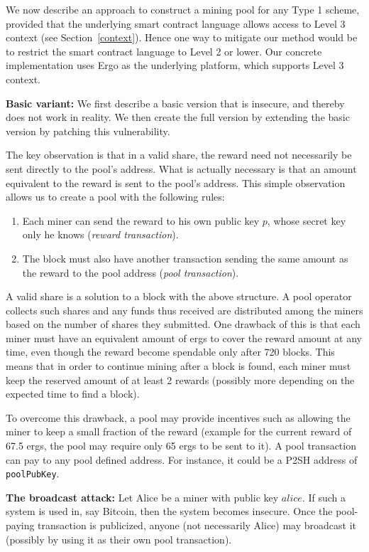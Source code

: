 \documentclass[11pt]{article}
\newcommand{\authnote}[2]{\marginpar{\parbox{\marginparwidth}{\tiny %
  \textsf{#1 {\textcolor{blue}{notes: #2}}}}}%
  \textcolor{blue}{\textbf{\dag}}}
\newcommand{\authnote}[2]{
  \textsf{#1 \textcolor{blue}{: #2}}}
\newcommand{\authnote}[2]{}
\newcommand{\snote}[1]{{\authnote{\textcolor{red}{Scalahub notes}}{#1}}}
\begin{document}
We now describe an approach to construct a mining pool for any Type 1 scheme, provided that the underlying smart contract language allows access to Level 3 context (see Section~\ref{context}). Hence one way to mitigate our method would be to restrict the smart contract language to Level 2 or lower. Our concrete implementation uses Ergo as the underlying platform, which supports Level 3 context.

\textbf{Basic variant:} We first describe a basic version that is insecure, and thereby does not work in reality. We then create the full version by extending the basic version by patching this vulnerability.

The key observation is that in a valid share, the reward need not necessarily be sent directly to the pool's address. What is actually necessary is that an amount equivalent to the reward is sent to the pool's address. This simple observation allows us to create a pool with the following rules:
\begin{enumerate}
	\item Each miner can send the reward to his own public key $p$, whose secret key only he knows ({\em reward transaction}).
	\item The block must also have another transaction sending the same amount as the reward to the pool address ({\em pool transaction}).
\end{enumerate}

\snote{Maybe make this section less Ergo-specific}

A valid share is a solution to a block with the above structure. A pool operator collects such shares and any funds thus received are distributed among the miners based on the number of shares they submitted. One drawback of this is that each miner must have an equivalent amount of ergs to cover the reward amount at any time, even though the reward become spendable only after 720 blocks. 
This means that in order to continue mining after a block is found, each miner must keep the reserved amount of at least 2 rewards (possibly more depending on the expected time to find a block).

 To overcome this drawback, a pool may provide incentives such as allowing the miner to keep a small fraction of the reward (example for the current reward of 67.5 ergs, the pool may require only 65 ergs to be sent to it). A pool transaction can pay to any pool defined address. For instance, it could be a P2SH address of \texttt{poolPubKey}. 


\textbf{The broadcast attack:} Let Alice be a miner with public key $alice$. If such a system is used in, say Bitcoin, then the system becomes insecure. Once the pool-paying transaction is publicized, anyone (not necessarily Alice) may broadcast it (possibly by using it as their own pool transaction). 
\end{document}
